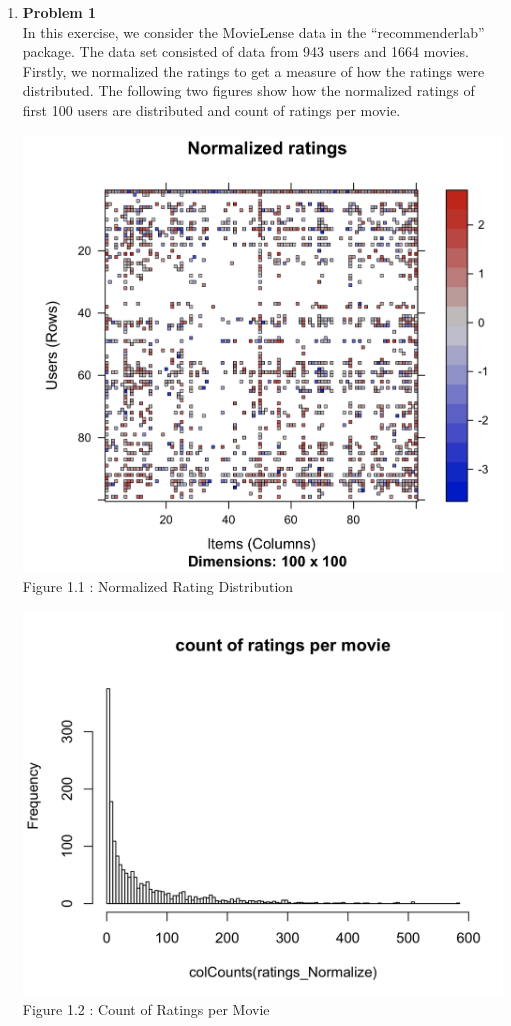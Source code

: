\documentclass[11pt]{article}
\begin{document}
\begin{enumerate}
\item \textbf{Problem 1}
\\
In this exercise, we consider the MovieLense data in the “recommenderlab” package. The data set consisted of data from 943 users and 1664 movies. 
\\Firstly, we normalized the ratings to get a measure of how the ratings were distributed. The following two figures show how the normalized ratings of first 100 users are distributed and count of ratings per movie.
\begin{center}
    \includegraphics[height=0.4\textwidth]{klkl.png}
    \\\footnotesize Figure 1.1 : Normalized Rating Distribution
\end{center}
\begin{center}
    \includegraphics[height=0.4\textwidth]{klklkl.png}
    \\\footnotesize Figure 1.2 : Count of Ratings per Movie
\end{center}


\end{enumerate}
\end{document}
